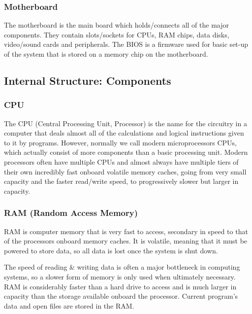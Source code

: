 \hypertarget{motherboard}{%
\subsubsection{Motherboard}\label{motherboard}}

The motherboard is the main board which holds/connects all of the major components. They contain slots/sockets for CPUs, RAM chips, data disks, video/sound cards and peripherals. The BIOS is a firmware used for basic set-up of the system that is stored on a memory chip on the motherboard.

\hypertarget{internal-structure-components}{%
\subsection{Internal Structure: Components}\label{internal-structure-components}}

\hypertarget{cpu}{%
\subsubsection{CPU}\label{cpu}}

The CPU (Central Processing Unit, Processor) is the name for the circuitry in a computer that deals almost all of the calculations and logical instructions given to it by programs. However, normally we call modern microprocessors CPUs, which actually consist of more components than a basic processing unit. Modern processors often have multiple CPUs and almost always have multiple tiers of their own incredibly fast onboard volatile memory caches, going from very small capacity and the faster read/write speed, to progressively slower but larger in capacity.

\hypertarget{ram-random-access-memory}{%
\subsubsection{RAM (Random Access Memory)}\label{ram-random-access-memory}}

RAM is computer memory that is very fast to access, secondary in speed to that of the processors onboard memory caches. It is volatile, meaning that it must be powered to store data, so all data is lost once the system is shut down.

The speed of reading \& writing data is often a major bottleneck in computing systems, so a slower form of memory is only used when ultimately necessary. RAM is considerably faster than a hard drive to access and is much larger in capacity than the storage available onboard the processor. Current program's data and open files are stored in the RAM.

